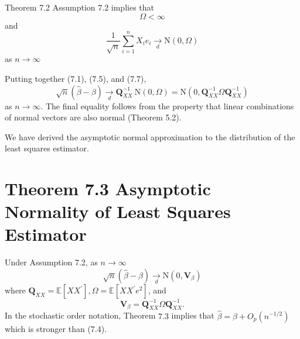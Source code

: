 \documentclass[10pt]{article}
\begin{document}
Theorem 7.2 Assumption $7.2$ implies that
$$
\Omega<\infty
$$
and
$$
\frac{1}{\sqrt{n}} \sum_{i=1}^{n} X_{i} e_{i} \underset{d}{\longrightarrow} \mathrm{N}(0, \Omega)
$$
as $n \rightarrow \infty$

Putting together (7.1), (7.5), and (7.7),
$$
\sqrt{n}(\widehat{\beta}-\beta) \underset{d}{\longrightarrow} \boldsymbol{Q}_{X X}^{-1} \mathrm{~N}(0, \Omega)=\mathrm{N}\left(0, \boldsymbol{Q}_{X X}^{-1} \Omega \boldsymbol{Q}_{X X}^{-1}\right)
$$
as $n \rightarrow \infty$. The final equality follows from the property that linear combinations of normal vectors are also normal (Theorem 5.2).

We have derived the asymptotic normal approximation to the distribution of the least squares estimator.

\section{Theorem 7.3 Asymptotic Normality of Least Squares Estimator}
Under Assumption 7.2, as $n \rightarrow \infty$
$$
\sqrt{n}(\widehat{\beta}-\beta) \underset{d}{\longrightarrow} \mathrm{N}\left(0, \boldsymbol{V}_{\beta}\right)
$$
where $\boldsymbol{Q}_{X X}=\mathbb{E}\left[X X^{\prime}\right], \Omega=\mathbb{E}\left[X X^{\prime} e^{2}\right]$, and
$$
\boldsymbol{V}_{\beta}=\boldsymbol{Q}_{X X}^{-1} \Omega \boldsymbol{Q}_{X X}^{-1} .
$$
In the stochastic order notation, Theorem $7.3$ implies that $\widehat{\beta}=\beta+O_{p}\left(n^{-1 / 2}\right)$ which is stronger than (7.4).
\end{document}
